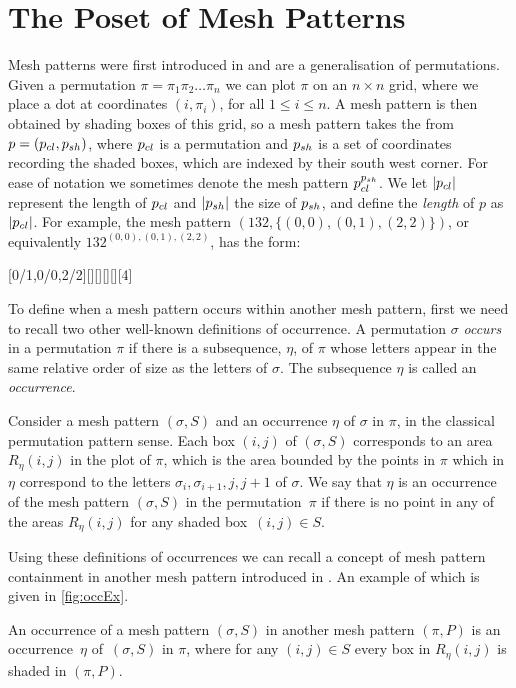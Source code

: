 \documentclass[11pt,a4paper,oneside]{article}
\begin{document}
\section{The Poset of Mesh Patterns}\label{sec:PosMP}
Mesh patterns were first introduced in \cite{Bra11} and
are a generalisation of permutations. Given a permutation
$\pi=\pi_1\pi_2\ldots\pi_n$ we can plot $\pi$ on an $n\times n$ grid,
where we place a dot at coordinates $(i,\pi_i)$, for all $1\le i\le n$.
A mesh pattern is then obtained by shading boxes of this grid, so a mesh
pattern takes the from $p=(p_{cl},p_{sh})$, where $p_{cl}$ is a permutation
and $p_{sh}$ is a set of coordinates recording the shaded boxes, which are indexed
by their south west corner. For ease of notation we sometimes denote the mesh
pattern $p_{cl}^{p_{sh}}$. We let $|p_{cl}|$ represent the length of $p_{cl}$
and $|p_{sh}|$ the size of $p_{sh}$, and define the \emph{length} of $p$ as $|p_{cl}|$.
For example, the mesh pattern $(132,\{(0,0),(0,1),(2,2)\})$,
or equivalently $132^{(0,0),(0,1),(2,2)}$, has the form:
\begin{center}
[0/1,0/0,2/2][][][][][4]
\end{center}

To define when a mesh pattern occurs within another mesh pattern, first we need to
recall two other well-known definitions of occurrence. A permutation $\sigma$
\emph{occurs} in a permutation $\pi$ if there is a subsequence, $\eta$, of $\pi$ whose letters
appear in the same relative order of size as the letters of $\sigma$. The subsequence
$\eta$ is called an \emph{occurrence}.

Consider a mesh pattern $(\sigma,S)$ and an occurrence $\eta$ of $\sigma$ in $\pi$, in the
classical permutation pattern sense. Each box $(i,j)$ of $(\sigma,S)$ corresponds to an
area $R_{\eta}(i,j)$ in the plot of $\pi$, which is the area bounded by the points in $\pi$
which in $\eta$ correspond to the letters $\sigma_i,\sigma_{i+1},j,j+1$ of $\sigma$.
We say that $\eta$ is an occurrence of the mesh pattern $(\sigma,S)$ in the permutation~$\pi$
if there is no point in any of the areas $R_{\eta}(i,j)$ for any shaded box~$(i,j)\in S$.

Using these definitions of occurrences we can recall a concept of mesh
pattern containment in another mesh pattern introduced in \cite{TU17}.
An example of which is given in \cref{fig:occEx}.

\begin{defn}[\cite{TU17}]\label{defn:meshOcc}
An occurrence of a mesh pattern $(\sigma,S)$ in another mesh
pattern $(\pi,P)$ is an occurrence~$\eta$ of~$(\sigma,S)$ in $\pi$, where for any $(i,j)\in S$
every box in $R_\eta(i,j)$ is shaded in $(\pi,P)$.
\end{defn}
\end{document}

